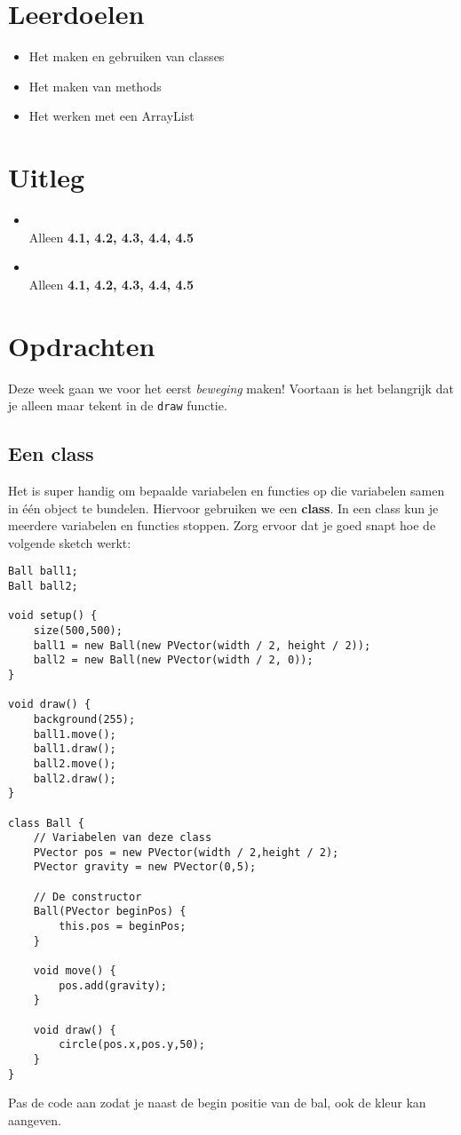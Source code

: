 \documentclass{../qh_exercise}
\begin{document}
\section{Leerdoelen}
\begin{itemize}
    \item Het maken en gebruiken van classes
    \item Het maken van methods
    \item Het werken met een ArrayList
\end{itemize}

\section{Uitleg}
\begin{itemize}
    \item {}\\
    Alleen \textbf{4.1, 4.2, 4.3, 4.4, 4.5}
    \item {}\\
    Alleen \textbf{4.1, 4.2, 4.3, 4.4, 4.5}\\
\end{itemize}

\newpage
\section{Opdrachten}
Deze week gaan we voor het eerst \textit{beweging} maken! Voortaan is het belangrijk dat je alleen maar tekent in de \texttt{draw} functie. 

\subsection{Een class}
Het is super handig om bepaalde variabelen en functies op die variabelen samen in \'e\'en object te bundelen. Hiervoor gebruiken we een \textbf{class}. In een class kun je meerdere variabelen en functies stoppen. Zorg ervoor dat je goed snapt hoe de volgende sketch werkt:
\begin{lstlisting}
Ball ball1;
Ball ball2;

void setup() {
    size(500,500);
    ball1 = new Ball(new PVector(width / 2, height / 2));
    ball2 = new Ball(new PVector(width / 2, 0));
}

void draw() {
    background(255);
    ball1.move();
    ball1.draw();
    ball2.move();
    ball2.draw();
}

class Ball {
    // Variabelen van deze class
    PVector pos = new PVector(width / 2,height / 2);
    PVector gravity = new PVector(0,5);
    
    // De constructor
    Ball(PVector beginPos) {
        this.pos = beginPos;
    }
    
    void move() {
        pos.add(gravity);
    }
    
    void draw() {
        circle(pos.x,pos.y,50);
    }
}
\end{lstlisting}
Pas de code aan zodat je naast de begin positie van de bal, ook de kleur kan aangeven.
\end{document}
